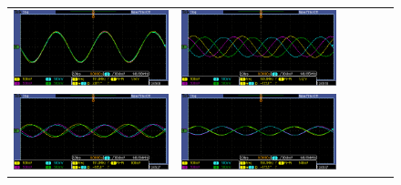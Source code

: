 \documentclass{article}
\newenvironment{standalone}{\begin{preview}}{\end{preview}}
\begin{document}
\begin{standalone}
\begin{figure}[!htbp]
\begin{tabular}{lccccc}
      \includegraphics[width=\linewidth/3]{../images/pasada-osciloscopio/pasada5.png}&
      \includegraphics[width=\linewidth/3]{../images/pasada-osciloscopio/pasada6.png}\\
      \includegraphics[width=\linewidth/3]{../images/pasada-osciloscopio/pasada7.png}&
      \includegraphics[width=\linewidth/3]{../images/pasada-osciloscopio/pasada8.png}&

\end{tabular}
\end{figure}
\end{standalone}
\end{document}
